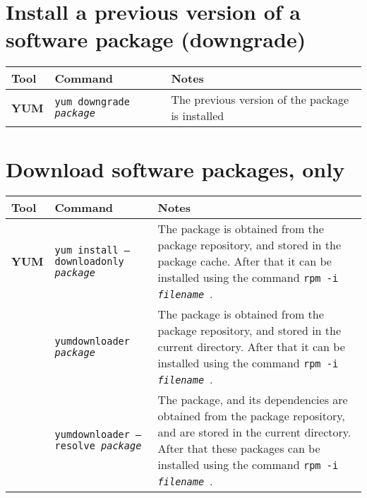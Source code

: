 \documentclass[10pt]{article}
\begin{document}
\section{Install a previous version of a software package (downgrade)}
\begin{tabular}{ p{3.5cm} p{9cm} p{11cm}}
  \hline
  \rowcolor{Gray}
  \textbf{Tool} & \textbf{Command} & \textbf{Notes} \\
  \hline 
  \textbf{YUM} & \texttt{yum downgrade \textit{package}} & The previous version of the package is installed \\
  \hline
\end{tabular}

\section{Download software packages, only}
\begin{tabular}{ p{3.5cm} p{9cm} p{11cm}}
  \hline
  \rowcolor{Gray}
  \textbf{Tool} & \textbf{Command} & \textbf{Notes} \\
  \hline 
  \textbf{YUM} & \texttt{yum install --downloadonly \textit{package}} & The package is obtained from the package repository, and stored in the package cache. After that it can be installed using the command \newline \texttt{rpm -i \textit{filename}}~.\\
  \rowcolor{Gray}
  & \texttt{yumdownloader \textit{package}} & The package is obtained from the package repository, and stored in the current directory. After that it can be installed using the command \newline \texttt{rpm -i \textit{filename}}~.\\
  & \texttt{yumdownloader --resolve \textit{package}} & The package, and its dependencies are obtained from the package repository, and are stored in the current directory. After that these packages can be installed using the command \texttt{rpm -i \textit{filename}}~.\\
  \hline
\end{tabular}
\end{document}
